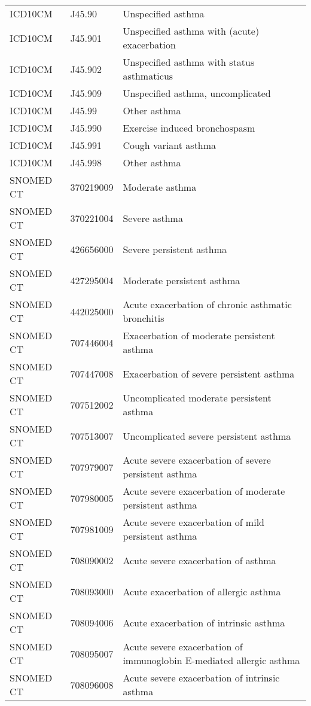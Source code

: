\begin{longtable}{p{}p{}p{}}
  ICD10CM & J45.90 & Unspecified asthma \\ 
  ICD10CM & J45.901 & Unspecified asthma with (acute) exacerbation \\ 
  ICD10CM & J45.902 & Unspecified asthma with status asthmaticus \\ 
  ICD10CM & J45.909 & Unspecified asthma, uncomplicated \\ 
  ICD10CM & J45.99 & Other asthma \\ 
  ICD10CM & J45.990 & Exercise induced bronchospasm \\ 
  ICD10CM & J45.991 & Cough variant asthma \\ 
  ICD10CM & J45.998 & Other asthma \\ 
  SNOMED CT & 370219009 & Moderate asthma \\ 
  SNOMED CT & 370221004 & Severe asthma \\ 
  SNOMED CT & 426656000 & Severe persistent asthma \\ 
  SNOMED CT & 427295004 & Moderate persistent asthma \\ 
  SNOMED CT & 442025000 & Acute exacerbation of chronic asthmatic bronchitis \\ 
  SNOMED CT & 707446004 & Exacerbation of moderate persistent asthma \\ 
  SNOMED CT & 707447008 & Exacerbation of severe persistent asthma \\ 
  SNOMED CT & 707512002 & Uncomplicated moderate persistent asthma \\ 
  SNOMED CT & 707513007 & Uncomplicated severe persistent asthma \\ 
  SNOMED CT & 707979007 & Acute severe exacerbation of severe persistent asthma \\ 
  SNOMED CT & 707980005 & Acute severe exacerbation of moderate persistent asthma \\ 
  SNOMED CT & 707981009 & Acute severe exacerbation of mild persistent asthma \\ 
  SNOMED CT & 708090002 & Acute severe exacerbation of asthma \\ 
  SNOMED CT & 708093000 & Acute exacerbation of allergic asthma \\ 
  SNOMED CT & 708094006 & Acute exacerbation of intrinsic asthma \\ 
  SNOMED CT & 708095007 & Acute severe exacerbation of immunoglobin E-mediated allergic asthma \\ 
  SNOMED CT & 708096008 & Acute severe exacerbation of intrinsic asthma \\ 

\end{longtable}

